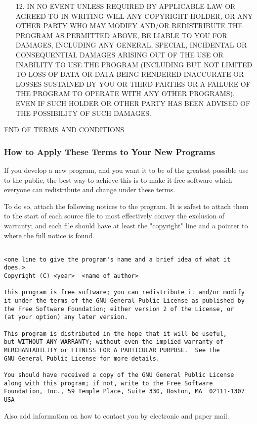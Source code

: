 {\begin{itemize}
\item[12.] IN NO EVENT UNLESS REQUIRED BY APPLICABLE LAW OR AGREED TO IN
  WRITING WILL ANY COPYRIGHT HOLDER, OR ANY OTHER PARTY WHO MAY MODIFY
  AND/OR REDISTRIBUTE THE PROGRAM AS PERMITTED ABOVE, BE LIABLE TO YOU
  FOR DAMAGES, INCLUDING ANY GENERAL, SPECIAL, INCIDENTAL OR
  CONSEQUENTIAL DAMAGES ARISING OUT OF THE USE OR INABILITY TO USE THE
  PROGRAM (INCLUDING BUT NOT LIMITED TO LOSS OF DATA OR DATA BEING
  RENDERED INACCURATE OR LOSSES SUSTAINED BY YOU OR THIRD PARTIES OR A
  FAILURE OF THE PROGRAM TO OPERATE WITH ANY OTHER PROGRAMS), EVEN IF
  SUCH HOLDER OR OTHER PARTY HAS BEEN ADVISED OF THE POSSIBILITY OF
  SUCH DAMAGES.
\end{itemize}

END OF TERMS AND CONDITIONS
}

\subsubsection*{How to Apply These Terms to Your New Programs}

  If you develop a new program, and you want it to be of the greatest
possible use to the public, the best way to achieve this is to make it
free software which everyone can redistribute and change under these terms.

  To do so, attach the following notices to the program.  It is safest
to attach them to the start of each source file to most effectively
convey the exclusion of warranty; and each file should have at least
the "copyright" line and a pointer to where the full notice is found.
{\small
\begin{verbatim}

<one line to give the program's name and a brief idea of what it does.>
Copyright (C) <year>  <name of author>

This program is free software; you can redistribute it and/or modify
it under the terms of the GNU General Public License as published by
the Free Software Foundation; either version 2 of the License, or
(at your option) any later version.

This program is distributed in the hope that it will be useful,
but WITHOUT ANY WARRANTY; without even the implied warranty of
MERCHANTABILITY or FITNESS FOR A PARTICULAR PURPOSE.  See the
GNU General Public License for more details.

You should have received a copy of the GNU General Public License
along with this program; if not, write to the Free Software
Foundation, Inc., 59 Temple Place, Suite 330, Boston, MA  02111-1307  USA
\end{verbatim}
}
Also add information on how to contact you by electronic and paper mail.

